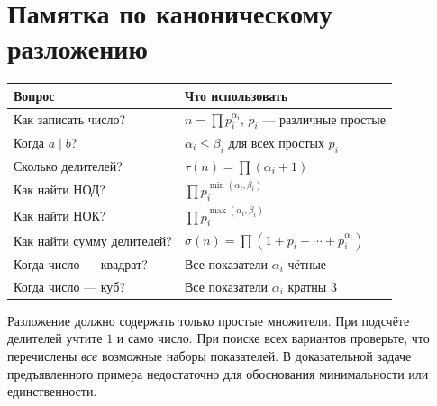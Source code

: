 \documentclass[11pt,a4paper]{article}
\newcommand{\concept}[1]{\par\needspace{4\baselineskip}{\color{navy}\bfseries #1.}\enspace}
\begin{document}
\section*{Памятка по каноническому разложению}
\begin{center}
\begin{tabularx}{\linewidth}{>{\raggedright\arraybackslash}p{50mm}X}
\toprule
\textbf{Вопрос}&\textbf{Что использовать}\\\midrule
Как записать число?&$n=\prod p_i^{\alpha_i}$, $p_i$ --- различные простые\\
Когда $a\mid b$?&$\alpha_i\le\beta_i$ для всех простых $p_i$\\
Сколько делителей?&$\tau(n)=\prod(\alpha_i+1)$\\
Как найти НОД?&$\prod p_i^{\min(\alpha_i,\beta_i)}$\\
Как найти НОК?&$\prod p_i^{\max(\alpha_i,\beta_i)}$\\
Как найти сумму делителей?&$\sigma(n)=\prod(1+p_i+\cdots+p_i^{\alpha_i})$\\
Когда число --- квадрат?&Все показатели $\alpha_i$ чётные\\
Когда число --- куб?&Все показатели $\alpha_i$ кратны $3$\\\bottomrule
\end{tabularx}
\end{center}
\concept{Самопроверка} Разложение должно содержать только простые множители. При подсчёте делителей учтите $1$ и само число. При поиске всех вариантов проверьте, что перечислены \emph{все} возможные наборы показателей. В доказательной задаче предъявленного примера недостаточно для обоснования минимальности или единственности.
\end{document}
